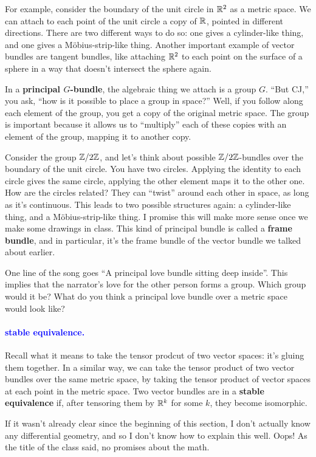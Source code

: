 \documentclass[11pt,paper=letter]{scrartcl}
\renewcommand{\bluebf}[1]{{\bfseries \color{Blue} #1}}
\renewcommand\wp[1]{\paragraph{\textcolor{Blue}{#1.}} \hspace{-1em}}
\newcommand\wl[1]{\label{w:#1}}
\begin{document}
For example, consider the boundary of the unit circle in $\mathbb R^2$ as a metric space. We can attach to each point of the unit circle a copy of $\mathbb R$, pointed in different directions. There are two different ways to do so: one gives a cylinder-like thing, and one gives a M\"obius-strip-like thing. Another important example of vector bundles are tangent bundles, like attaching $\mathbb R^2$ to each point on the surface of a sphere in a way that doesn't intersect the sphere again.

In a \bluebf{principal $G$-bundle}, the algebraic thing we attach is a group $G$. ``But CJ,'' you ask, ``how is it possible to place a group in space?'' Well, if you follow along each element of the group, you get a copy of the original metric space. The group is important because it allows us to ``multiply'' each of these copies with an element of the group, mapping it to another copy.

Consider the group $\mathbb Z/2\mathbb Z$, and let's think about possible $\mathbb Z/2\mathbb Z$-bundles over the boundary of the unit circle. You have two circles. Applying the identity to each circle gives the same circle, applying the other element maps it to the other one. How are the circles related? They can ``twist'' around each other in space, as long as it's continuous. This leads to two possible structures again: a cylinder-like thing, and a M\"obius-strip-like thing. I promise this will make more sense once we make some drawings in class. This kind of principal bundle is called a \textbf{frame bundle}, and in particular, it's the frame bundle of the vector bundle we talked about earlier.

\begin{exrboxed}
  One line of the song goes ``A principal love bundle sitting deep inside''. This implies that the narrator's love for the other person forms a group. Which group would it be? What do you think a principal love bundle over a metric space would look like?
\end{exrboxed}

\wp{stable equivalence}
\wl{stable equivalence}
Recall what it means to take the tensor prodcut of two vector spaces: it's gluing them together. In a similar way, we can take the tensor product of two vector bundles over the same metric space, by taking the tensor product of vector spaces at each point in the metric space. Two vector bundles are in a \bluebf{stable equivalence} if, after tensoring them by $\mathbb R^k$ for some $k$, they become isomorphic.

\begin{remboxed}
  If it wasn't already clear since the beginning of this section, I don't actually know any differential geometry, and so I don't know how to explain this well. Oops! As the title of the class said, no promises about the math.
\end{remboxed}
\end{document}
